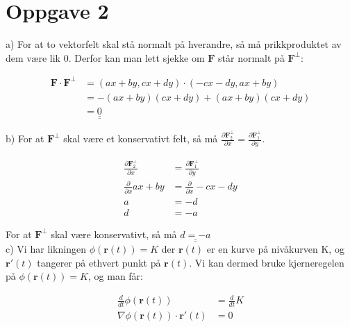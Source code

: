 \documentclass[12pt, a4paper]{article}
\begin{document}
\newpage

\section*{Oppgave 2}

a) For at to vektorfelt skal stå normalt på hverandre, så må prikkproduktet av dem være lik 0. 
Derfor kan man lett sjekke om $\textbf{F}$ står normalt på $\textbf{F}^\perp$:

\begin{equation}
    \begin{split}
        \textbf{F} \cdot \textbf{F}^\perp &= (ax + by, cx + dy) \cdot (-cx -dy, ax + by) \\
                                          &= -(ax + by)(cx + dy) + (ax + by)(cx + dy) \\
                                          &= \underline{\underline{0}}
    \end{split}
\end{equation}

b) For at $\textbf{F}^\perp$ skal være et konservativt felt, så må $\frac{\partial \textbf{F}^\perp_2}{\partial x} = \frac{\partial \textbf{F}^\perp_1}{\partial y}$.

\begin{equation}
    \begin{split}
        \frac{\partial \textbf{F}^\perp_2}{\partial x} &= \frac{\partial \textbf{F}^\perp_1}{\partial y} \\
                    \frac{\partial}{\partial x} ax +by &= \frac{\partial}{\partial x} -cx -dy \\
                                                     a &= -d \\
                                                     d &= -a
    \end{split}
\end{equation}

For at $\textbf{F}^\perp$ skal være konservativt, så må $\underline{\underline{d = -a}}$ \\

c) Vi har likningen $\phi(\textbf{r}(t)) = K$ der $\textbf{r}(t)$ er en kurve på nivåkurven K, og $\textbf{r}'(t)$ tangerer på ethvert punkt på
$\textbf{r}(t)$. Vi kan dermed bruke kjerneregelen på $\phi(\textbf{r}(t)) = K$, og man får:

\begin{equation}
    \begin{split}
        \frac{d}{dt}\phi(\textbf{r}(t)) &= \frac{d}{dt} K \\
        \nabla\phi(\textbf{r}(t)) \cdot \textbf{r}'(t) &= 0
    \end{split}
\end{equation}
\end{document}
